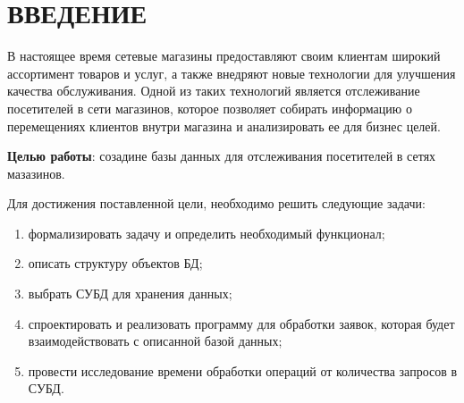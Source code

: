 \section*{ВВЕДЕНИЕ}

В настоящее время сетевые магазины предоставляют своим клиентам широкий ассортимент
товаров и услуг, а также внедряют новые технологии для улучшения качества обслуживания.
Одной из таких технологий является отслеживание посетителей в сети магазинов,
которое позволяет собирать информацию о перемещениях клиентов внутри магазина и анализировать
ее для бизнес целей.

\textbf{Целью работы}: созадине базы данных для отслеживания посетителей в сетях мазазинов.


Для достижения поставленной цели, необходимо решить следующие задачи:
\begin{enumerate}[label=\arabic*)]
	\item формализировать задачу и определить необходимый функционал;
	\item описать структуру объектов БД;
	\item выбрать СУБД для хранения данных;
	\item спроектировать и реализовать программу для обработки заявок, которая будет взаимодействовать с описанной базой данных; 
	\item провести исследование времени обработки операций от количества запросов в СУБД.
\end{enumerate}